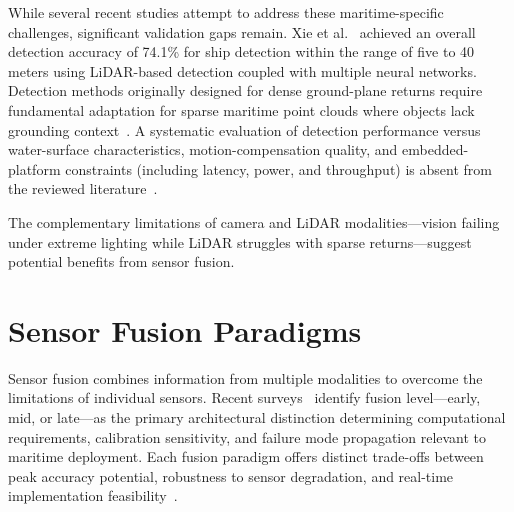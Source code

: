 \documentclass{erauthesis}
\begin{document}
While several recent studies attempt to address these maritime-specific challenges, significant validation gaps remain.
Xie et al.~\cite{xie2024} achieved an overall detection accuracy of 74.1\% for ship detection within the range of five to 40 meters using LiDAR-based detection coupled with multiple neural networks.
Detection methods originally designed for dense ground-plane returns require fundamental adaptation for sparse maritime point clouds where objects lack grounding context~\cite{kunz2005}.
A systematic evaluation of detection performance versus water-surface characteristics, motion-compensation quality, and embedded-platform constraints (including latency, power, and throughput) is absent from the reviewed literature~\cite{xie2024, ahmed2024}.

The complementary limitations of camera and \ac{LiDAR} modalities—vision failing under extreme lighting while LiDAR struggles with sparse returns—suggest potential benefits from sensor fusion.

\section{Sensor Fusion Paradigms}

Sensor fusion combines information from multiple modalities to overcome the limitations of individual sensors.
Recent surveys~\cite{feng2021, tufekci2023, huang2024} identify fusion level—early, mid, or late—as the primary architectural distinction determining computational requirements, calibration sensitivity, and failure mode propagation relevant to maritime deployment.
Each fusion paradigm offers distinct trade-offs between peak accuracy potential, robustness to sensor degradation, and real-time implementation feasibility~\cite{feng2021}.
\end{document}
